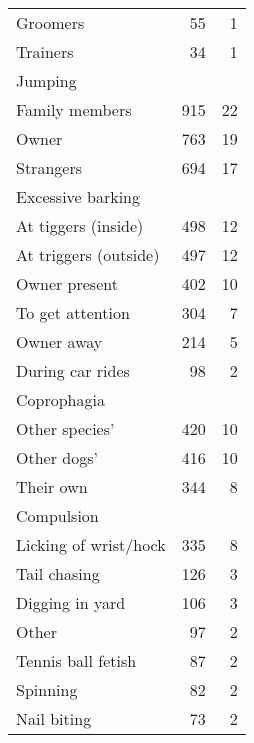 \documentclass[varwidth=\maxdimen]{standalone}
\newcommand{\subrow}[1]{\hspace{1.25em}#1}
\begin{document}
\begin{tabular}[t]{lrr}
  \subrow{Groomers}                            &       55 &            1 \\
  \subrow{Trainers}                            &       34 &            1 \\
Jumping \\
  \subrow{Family members}                      &      915 &           22 \\
  \subrow{Owner}                               &      763 &           19 \\
  \subrow{Strangers}                           &      694 &           17 \\
Excessive barking \\
  \subrow{At tiggers (inside)}                 &      498 &           12 \\
  \subrow{At triggers (outside)}               &      497 &           12 \\
  \subrow{Owner present}                       &      402 &            10 \\
  \subrow{To get attention}                    &      304 &            7 \\
  \subrow{Owner away}                          &      214 &            5 \\
  \subrow{During car rides}                    &       98 &            2 \\
Coprophagia \\
  \subrow{Other species'}                      &      420 &           10 \\
  \subrow{Other dogs'}                         &      416 &           10 \\
  \subrow{Their own}                           &      344 &            8 \\
Compulsion \\
  \subrow{Licking of wrist/hock}               &      335 &            8 \\
  \subrow{Tail chasing}                        &      126 &            3 \\
  \subrow{Digging in yard}                     &      106 &            3 \\
  \subrow{Other}                               &       97 &            2 \\
  \subrow{Tennis ball fetish}                  &       87 &            2 \\
  \subrow{Spinning}                            &       82 &            2 \\
  \subrow{Nail biting}                         &       73 &            2 \\

\end{tabular}
\end{document}
